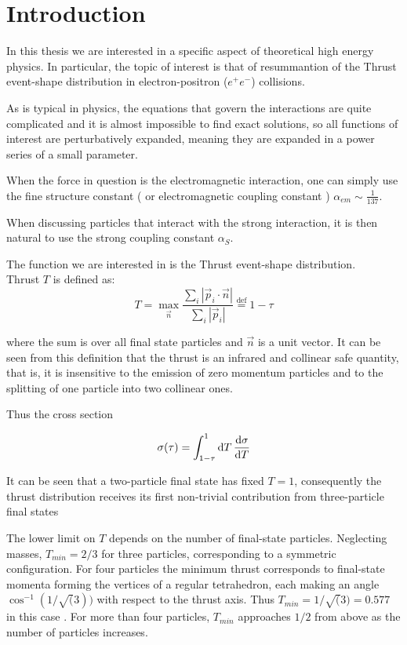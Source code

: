 \documentclass[../main.tex]{subfiles}
\begin{document}
\section{Introduction}

In this thesis we are interested in a specific aspect of theoretical high energy physics. In particular,
the topic of interest is that of resummantion of the Thrust event-shape distribution in electron-positron ($e^+e^-$) collisions.

As is typical in physics, the equations that govern the interactions are quite complicated and it is almost impossible to find exact solutions, so all
functions of interest are perturbatively expanded, meaning they are expanded in a power series of a small parameter. 

When the force in question is the electromagnetic interaction, one can
simply use the fine structure constant ( or electromagnetic coupling constant ) $\alpha_{em} \sim \frac{1}{137} $.

When discussing particles that interact with the strong interaction, it is then natural to use the strong
coupling constant $ \alpha_S $.

The function we are interested in is the Thrust event-shape distribution. \\
Thrust $T$ is defined as:
\begin{equation} \label{eq:Thrust}
    T = \max_{\vec{n}} \frac{\sum_i |\vec{p}_i \cdot \vec{n}|}{\sum_i |\vec{p}_i|} \stackrel{\text{def}}{=} 1-\tau
\end{equation}

where the sum is over all final state particles and $\vec{n}$ is a unit vector.
It can be seen from this definition that the thrust is an infrared and collinear safe
quantity, that is, it is insensitive to the emission of zero momentum particles and to the splitting of 
one particle into two collinear ones.

Thus the cross section 

\begin{equation}\label{eq:cross_section}
    \sigma(\tau) = \int^1_{1-\tau} \dd{T} \dv{\sigma}{T}
\end{equation}

It can be seen that a two-particle final state has fixed $T = 1$, consequently the thrust
distribution receives its first non-trivial contribution from three-particle final states

The lower limit on $T$ depends on the number of final-state particles.
Neglecting masses, $T_{min} = 2/3$ for three particles, corresponding to a symmetric
configuration. For four particles the minimum thrust corresponds to final-state
momenta forming the vertices of a regular tetrahedron, each making an angle
$\cos^{-1}(1/\sqrt(3))$ with respect to the thrust axis. Thus $T_{min} = 1/\sqrt(3) = 0.577$ in this
case . For more than four particles, $T_{min}$ approaches $1/2$ from above as the number of particles increases.
\end{document}
